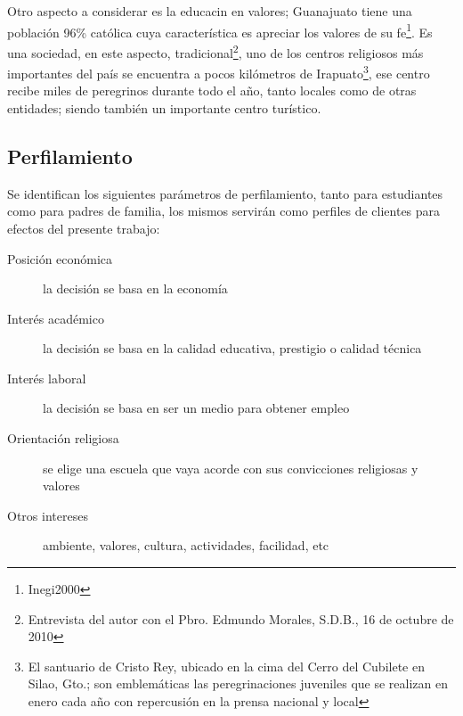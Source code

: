 Otro aspecto a considerar es la educacin en valores; Guanajuato tiene una población 96\% católica cuya característica es apreciar los valores de su fe\footnote{Inegi2000}. Es una sociedad, en este aspecto, tradicional\footnote{Entrevista del autor con el Pbro. Edmundo Morales, S.D.B., 16 de octubre de 2010}, uno de los centros religiosos más importantes del país se encuentra a pocos kilómetros de Irapuato\footnote{El santuario de Cristo Rey, ubicado en la cima del Cerro del Cubilete en Silao, Gto.; son emblemáticas las peregrinaciones juveniles que se realizan en enero cada año con repercusión en la prensa nacional y local}, ese centro recibe miles de peregrinos durante todo el año, tanto locales como de otras entidades; siendo también un importante centro turístico.

%

\subsection{Perfilamiento}

Se identifican los siguientes parámetros de perfilamiento, tanto para estudiantes como para padres de familia, los mismos servirán como perfiles de clientes para efectos del presente trabajo:

\begin{description}
	\item [Posición económica] la decisión se basa en la economía
	\item [Interés académico] la decisión se basa en la calidad educativa, prestigio o calidad técnica
	\item [Interés laboral] la decisión se basa en ser un medio para obtener empleo
	\item [Orientación religiosa] se elige una escuela que vaya acorde con sus convicciones religiosas y valores
	\item [Otros intereses] ambiente, valores, cultura, actividades, facilidad, etc
\end{description}


